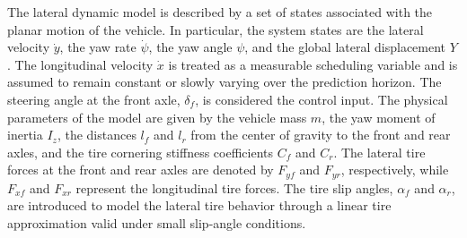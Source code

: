 \documentclass{ifacconf}
\begin{document}
The lateral dynamic model is described by a set of states associated with the planar motion of the vehicle. In particular, the system states are the lateral velocity $\dot{y}$, the yaw rate $\dot{\psi}$, the yaw angle $\psi$, and the global lateral displacement $Y$. The longitudinal velocity $\dot{x}$ is treated as a measurable scheduling variable and is assumed to remain constant or slowly varying over the prediction horizon. The steering angle at the front axle, $\delta_f$, is considered the control input. The physical parameters of the model are given by the vehicle mass $m$, the yaw moment of inertia $I_z$, the distances $l_f$ and $l_r$ from the center of gravity to the front and rear axles, and the tire cornering stiffness coefficients $C_f$ and $C_r$. The lateral tire forces at the front and rear axles are denoted by $F_{yf}$ and $F_{yr}$, respectively, while $F_{xf}$ and $F_{xr}$ represent the longitudinal tire forces. The tire slip angles, $\alpha_f$ and $\alpha_r$, are introduced to model the lateral tire behavior through a linear tire approximation valid under small slip-angle conditions.
\end{document}
